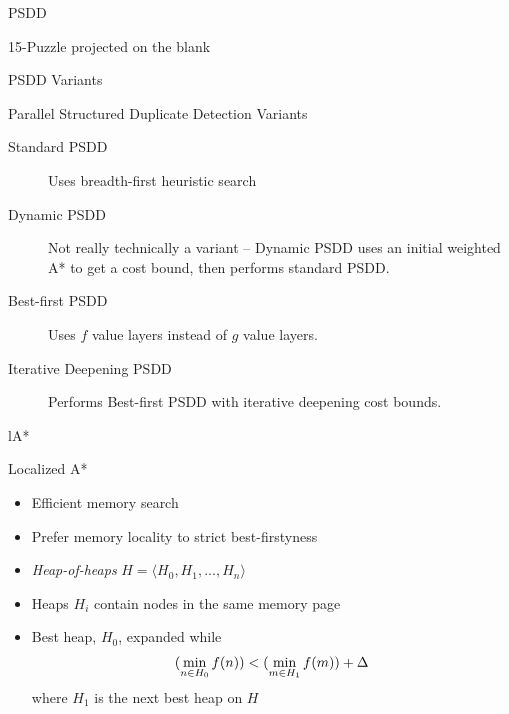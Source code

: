 \documentclass[style=unh]{powerdot}
\begin{document}
\begin{slide}{PSDD}
   {
    \vspace{-.3in}
    \begin{center}
      15-Puzzle projected on the blank
    \end{center}
  }

\end{slide}

\begin{slide}{PSDD Variants}
  \vspace{.2in}
  \begin{center}
    Parallel Structured Duplicate Detection Variants
  \end{center}

  \begin{description}

  \item[Standard PSDD]
    Uses breadth-first heuristic search
  \item[Dynamic PSDD]
    Not really technically a variant -- Dynamic PSDD uses an initial
    weighted A* to get a cost bound, then performs standard PSDD.
  \item[Best-first PSDD]
    Uses $f$ value layers instead of $g$ value layers.
  \item[Iterative Deepening PSDD]
    Performs Best-first PSDD with iterative deepening cost bounds.
  \end{description}

\end{slide}


\begin{slide}{lA*}
  \vspace{.2in}
  \begin{center}
    Localized A*
  \end{center}

  \begin{itemize}
  \item Efficient memory search
  \item Prefer memory locality to strict best-firstyness
  \item \emph{Heap-of-heaps} $H = \langle H_0, H_1, ..., H_n \rangle$
  \item Heaps $H_i$ contain nodes in the same memory page
  \item Best heap, $H_0$, expanded while
    \begin{eqnarray*}
      (\mathop{\rm min}_{n \in H_0} f(n)) < (\mathop{\rm min}_{m \in H_1} f(m)) + \Delta
    \end{eqnarray*}
    where $H_1$ is the next best heap on $H$
  \end{itemize}

\end{slide}
\end{document}
